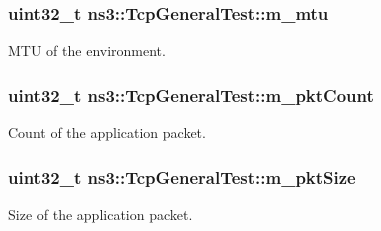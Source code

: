 \subsubsection[{\texorpdfstring{m\+\_\+mtu}{m_mtu}}]{\setlength{\rightskip}{0pt plus 5cm}uint32\+\_\+t ns3\+::\+Tcp\+General\+Test\+::m\+\_\+mtu\hspace{0.3cm}{\ttfamily [private]}}\hypertarget{classns3_1_1TcpGeneralTest_a391718e29aac6692abf8ecfc5040e935}{}\label{classns3_1_1TcpGeneralTest_a391718e29aac6692abf8ecfc5040e935}


M\+TU of the environment. 

\subsubsection[{\texorpdfstring{m\+\_\+pkt\+Count}{m_pktCount}}]{\setlength{\rightskip}{0pt plus 5cm}uint32\+\_\+t ns3\+::\+Tcp\+General\+Test\+::m\+\_\+pkt\+Count\hspace{0.3cm}{\ttfamily [private]}}\hypertarget{classns3_1_1TcpGeneralTest_a530b5d986e7da3f8fe7735cf2c2caf47}{}\label{classns3_1_1TcpGeneralTest_a530b5d986e7da3f8fe7735cf2c2caf47}


Count of the application packet. 

\subsubsection[{\texorpdfstring{m\+\_\+pkt\+Size}{m_pktSize}}]{\setlength{\rightskip}{0pt plus 5cm}uint32\+\_\+t ns3\+::\+Tcp\+General\+Test\+::m\+\_\+pkt\+Size\hspace{0.3cm}{\ttfamily [private]}}\hypertarget{classns3_1_1TcpGeneralTest_a4d3de84f15604ad31296fda0386968f4}{}\label{classns3_1_1TcpGeneralTest_a4d3de84f15604ad31296fda0386968f4}


Size of the application packet. 

